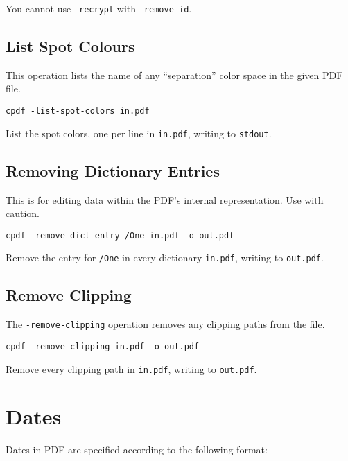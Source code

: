 \documentclass{book}
\begin{document}
You cannot use \texttt{-recrypt} with \texttt{-remove-id}.

\section{List Spot Colours}

This operation lists the name of any ``separation'' color space in the given PDF file.

  \begin{framed}
  \small\noindent\verb!cpdf -list-spot-colors in.pdf!

  \vspace{2.5mm}
  \noindent List the spot colors, one per line in \texttt{in.pdf}, writing to \texttt{stdout}.
  \end{framed}

\section{Removing Dictionary Entries}

This is for editing data within the PDF's internal representation. Use with caution.

  \begin{framed}
  \small\noindent\verb!cpdf -remove-dict-entry /One in.pdf -o out.pdf!

  \vspace{2.5mm}
  \noindent Remove the entry for \texttt{/One} in every dictionary \texttt{in.pdf}, writing to \texttt{out.pdf}. 
  \end{framed}


\section{Remove Clipping}


The \texttt{-remove-clipping} operation removes any clipping paths from the file.

  \begin{framed}
  \small\noindent\verb!cpdf -remove-clipping in.pdf -o out.pdf!

  \vspace{2.5mm}
  \noindent Remove every clipping path in \texttt{in.pdf}, writing to \texttt{out.pdf}. 
  \end{framed}


\appendix
\chapter{Dates}\pagestyle{empty}
\label{dates}
Dates in PDF are specified according to the following format:
\end{document}
